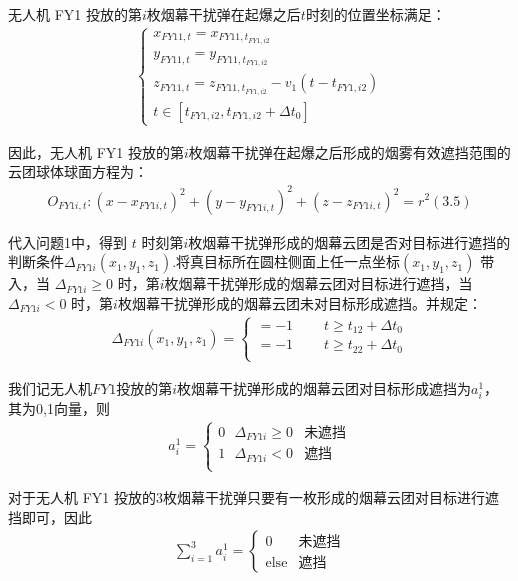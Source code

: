 \documentclass[../main.tex]{subfiles}
\begin{document}
\begin{itemize}
\par 无人机 FY1 投放的第$i$枚烟幕干扰弹在起爆之后$t$时刻的位置坐标满足：
\begin{align}\label{12.9}
	\left\{ \begin{array}{l}
	x_{FY11,t}=x_{FY11,t_{FY1,i2}}\\
	y_{FY11,t}=y_{FY11,t_{FY1,i2}}\\
	z_{FY11,t}=z_{FY11,t_{FY1,i2}}-v_1\left( t-t_{FY1,i2} \right)\\
	t\in \left[ t_{FY1,i2},t_{FY1,i2}+\Delta t_0 \right]
\end{array} \right.
\end{align}
\par 因此，无人机 FY1 投放的第$i$枚烟幕干扰弹在起爆之后形成的烟雾有效遮挡范围的云团球体球面方程为：
\begin{align}\label{13.9}
	O_{FY1i,t}:\left( x-x_{FY1i,t} \right) ^2+\left( y-y_{FY1i,t} \right) ^2+\left( z-z_{FY1i,t} \right) ^2=r^2\left( 3.5 \right) 
\end{align}
\par 代入问题1中，得到 $t$ 时刻第$i$枚烟幕干扰弹形成的烟幕云团是否对目标进行遮挡的判断条件$\Delta _{FY1i}\left( x_1,y_1,z_1 \right) $.将真目标所在圆柱侧面上任一点坐标$(x_1, y_1, z_1)$ 带入，当 $\Delta _{FY1i} \geq 0$ 时，第$i$枚烟幕干扰弹形成的烟幕云团对目标进行遮挡，当 $\Delta _{FY1i} < 0$ 时，第$i$枚烟幕干扰弹形成的烟幕云团未对目标形成遮挡。并规定： 
\begin{align}\label{14.9}
	\Delta _{FY1i}\left( x_1,y_1,z_1 \right) =\left\{ \begin{array}{l}
	=-1\ \ \ \ \ \ \ \ \ \ t\ge t_{12}+\Delta t_0\\
	=-1\ \ \ \ \ \ \ \ \ \ t\ge t_{22}+\Delta t_0\\
\end{array} \right.
\end{align}





我们记无人机$FY1$投放的第$i$枚烟幕干扰弹形成的烟幕云团对目标形成遮挡为$a_{i}^{1}$，其为0,1向量，则
\begin{align}
a_{i}^{1}=\begin{cases}
	0\ \ \ \Delta _{FY1i}\geq 0&		\text{未遮挡}\\
	1\ \ \ \Delta _{FY1i}<0&		\text{遮挡}\\
\end{cases}
\end{align}\label{11.7}
\par 对于无人机 FY1 投放的3枚烟幕干扰弹只要有一枚形成的烟幕云团对目标进行遮挡即可，因此
\begin{align}
\sum_{i=1}^{3} a_{i}^{1} = 
\begin{cases} 
0 & \text{未遮挡} \\
\text{else} & \text{遮挡}
\end{cases}
\end{align}




\end{itemize}
\end{document}
